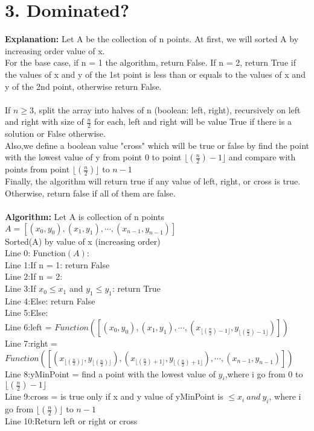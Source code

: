 \documentclass[11pt]{article}
\newcommand{\tab}{\hspace*{2em}}
\begin{document}
\newpage
\section*{3. Dominated?}
\noindent
\Large{}
\textbf{Explanation:}
Let A be the collection of n points. At first, we will sorted A by increasing order value of x.\\
For the base case, if n = 1 the algorithm, return False. If n = 2, return True if the values of x and y of the 1st point is less than or equals to the values of x and y of the 2nd point, otherwise return False.\\
\\
If $n \geqslant 3$, split the array into halves of n (boolean: left, right), recursively on left and right with size of $\frac{n}{2}$ for each, left and right will be value True if there is a solution or False otherwise. \\
Also,we define a boolean value "cross" which will be true or false by find the point with the lowest value of y from point 0 to point $\lfloor(\frac{n}{2})-1\rfloor$ and compare with points from point $\lfloor(\frac{n}{2})\rfloor$ to $n - 1$\\
Finally, the algorithm will return true if any value of left, right, or cross is true. Otherwise, return false if all of them are false.\\
\\
\noindent
\textbf{Algorithm:}
Let A is collection of n points\\
$A = [(x_0,y_0),(x_1,y_1),\cdots,(x_{n-1},y_{n-1})]$\\
Sorted(A) by value of x (increasing order)\\
Line 0: Function$(A)$:\\
Line 1:\tab If n = 1: return False\\
Line 2:\tab If n = 2: \\
Line 3:\tab\tab If $x_0 \leqslant x_1$ and $y_1 \leqslant y_1$: return True\\
Line 4:\tab\tab Else: return False\\
Line 5:\tab Else:\\
Line 6:\tab\tab left = $Function([(x_0,y_0),(x_1,y_1),\cdots,(x_{\lfloor(\frac{n}{2})-1\rfloor},y_{\lfloor(\frac{n}{2})-1\rfloor})])$\\
Line 7:\tab\tab right = $Function([(x_{\lfloor(\frac{n}{2})\rfloor},y_{\lfloor(\frac{n}{2})\rfloor}),(x_{\lfloor(\frac{n}{2})+1\rfloor },y_{\lfloor(\frac{n}{2})+1\rfloor}),\cdots,(x_{n-1}, y_{n-1})])$\\
Line 8:\tab\tab yMinPoint = find a point with the lowest value of $y_i$,where i go from 0 to $\lfloor(\frac{n}{2})-1\rfloor$\\
Line 9:\tab\tab cross = is true only if x and y value of yMinPoint is $\leqslant x_i\ and\ y_i$, where i go from $\lfloor(\frac{n}{2})\rfloor$ to $n-1$\\
Line 10:\tab\tab Return left or right or cross
\\
\end{document}
